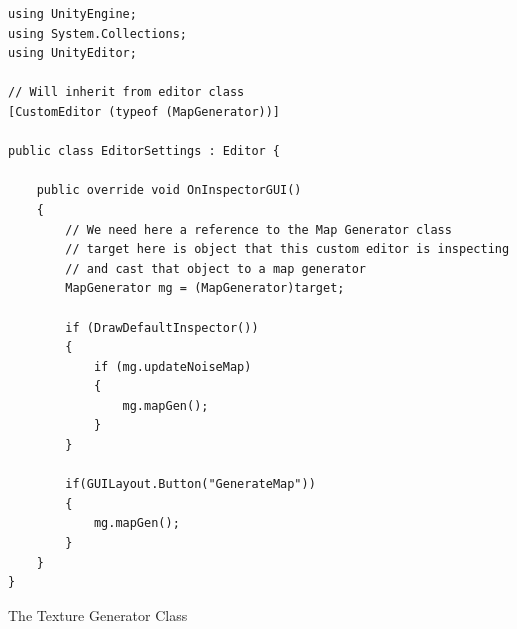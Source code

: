 \documentclass[a4paper,12pt]{book}
\begin{document}
\begin{lstlisting}
using UnityEngine;
using System.Collections;
using UnityEditor;

// Will inherit from editor class
[CustomEditor (typeof (MapGenerator))]

public class EditorSettings : Editor {

    public override void OnInspectorGUI()
    {
        // We need here a reference to the Map Generator class
        // target here is object that this custom editor is inspecting 
        // and cast that object to a map generator
        MapGenerator mg = (MapGenerator)target;

        if (DrawDefaultInspector())
        {
            if (mg.updateNoiseMap)
            {
                mg.mapGen();
            }
        }

        if(GUILayout.Button("GenerateMap"))
        {
            mg.mapGen();
        }
    }
}

\end{lstlisting}

The Texture Generator Class
\end{document}
